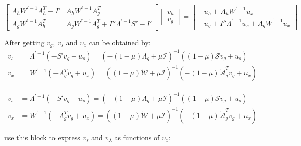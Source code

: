 \begin{equation}
\begin{bmatrix}
A_h W^{' -1} A^T_h  - I' & A_h W^{'-1} A^T_g \\
A_g W^{' -1} A^T_h  &   A_g  W^{' -1}A^T_g +  I'' \Lambda^{' -1} S' - I' 
\end{bmatrix} 
\begin{bmatrix}
v_h \\ v_g 
\end{bmatrix} =
\begin{bmatrix}
 -u_h +  A_h W^{'-1} u_x \\ - u_g  + I''\Lambda^{' -1} u_s + A_g  W^{' -1} u_x
\end{bmatrix}
\end{equation}


After getting $v_g$, $v_s$ and $v_x$ can be obtained by:
\begin{equation}
\begin{aligned}
v_s &=  \Lambda^{' -1} ( -S'v_g + u_s)  =\left( -(1-\mu) \Lambda_g + \mu  \mathcal{I}   \right)^{-1} \left( (1-\mu)\mathcal{S}v_g + u_s \right)  \\
v_x &= W^{' -1} \left( - A^T_g v_g + u_x \right)=\left( (1-\mu) \tilde{\mathcal{W}} + \mu \mathcal{I}  \right)^{-1} \left( - (1-\mu) \tilde{\mathcal{A}}^T_g  v_g + u_x  \right)
\end{aligned}
\end{equation}


\begin{equation}
\begin{aligned}
v_s &=  \Lambda^{' -1} ( -S'v_g + u_s)  =\left( -(1-\mu) \Lambda_g + \mu  \mathcal{I}   \right)^{-1} \left( (1-\mu)\mathcal{S}v_g + u_s \right)  \\
v_x &= W^{' -1} \left( - A^T_g v_g + u_x \right)=\left( (1-\mu) \tilde{\mathcal{W}} + \mu \mathcal{I}  \right)^{-1} \left( - (1-\mu) \tilde{\mathcal{A}}^T_g  v_g + u_x  \right)
\end{aligned}
\end{equation}


use this block to express $v_s$ and $v_\lambda$ as functions of $v_x$:




